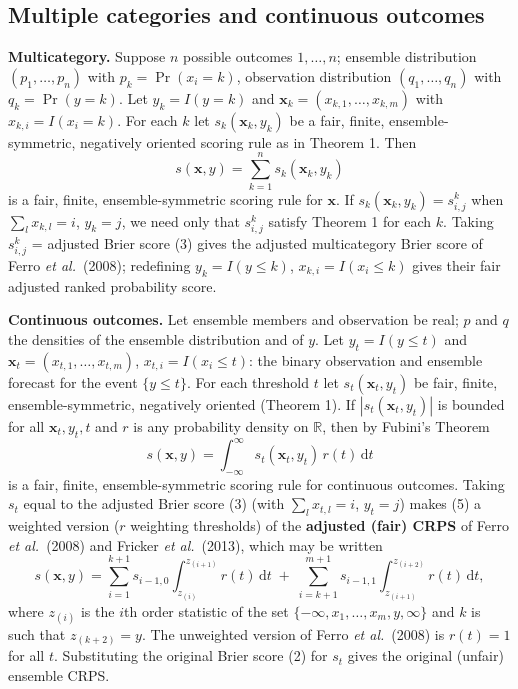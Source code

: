 \documentclass{article}
\newcommand{\bx}{\mathbf{x}}
\newcommand{\dd}{\mathrm{d}}
\begin{document}
\subsection{Multiple categories and continuous outcomes}
\textbf{Multicategory.} Suppose $n$ possible outcomes $1,\dots,n$; ensemble
distribution $(p_1,\dots,p_n)$ with $p_k=\Pr(x_i=k)$, observation distribution
$(q_1,\dots,q_n)$ with $q_k=\Pr(y=k)$. Let $y_k=I(y=k)$ and
$\bx_k=(x_{k,1},\dots,x_{k,m})$ with $x_{k,i}=I(x_i=k)$. For each $k$ let
$s_k(\bx_k,y_k)$ be a fair, finite, ensemble-symmetric, negatively oriented
scoring rule as in Theorem 1. Then
\begin{equation}\tag{4}
  s(\bx,y) = \sum_{k=1}^n s_k(\bx_k,y_k)
\end{equation}
is a fair, finite, ensemble-symmetric scoring rule for $\bx$. If
$s_k(\bx_k,y_k)=s^k_{i,j}$ when $\sum_l x_{k,l}=i$, $y_k=j$, we need only that
$s^k_{i,j}$ satisfy Theorem 1 for each $k$. Taking $s^k_{i,j}$ = adjusted Brier
score (3) gives the adjusted multicategory Brier score of Ferro \emph{et al.}\
(2008); redefining $y_k=I(y\le k)$, $x_{k,i}=I(x_i\le k)$ gives their fair
adjusted ranked probability score.

\textbf{Continuous outcomes.} Let ensemble members and observation be real;
$p$ and $q$ the densities of the ensemble distribution and of $y$. Let
$y_t=I(y\le t)$ and $\bx_t=(x_{t,1},\dots,x_{t,m})$, $x_{t,i}=I(x_i\le t)$:
the binary observation and ensemble forecast for the event $\{y\le t\}$. For
each threshold $t$ let $s_t(\bx_t,y_t)$ be fair, finite, ensemble-symmetric,
negatively oriented (Theorem 1). If $|s_t(\bx_t,y_t)|$ is bounded for all
$\bx_t,y_t,t$ and $r$ is any probability density on $\mathbb{R}$, then by
Fubini's Theorem
\begin{equation}\tag{5}
  s(\bx,y) = \int_{-\infty}^{\infty} s_t(\bx_t,y_t)\,r(t)\,\dd t
\end{equation}
is a fair, finite, ensemble-symmetric scoring rule for continuous outcomes.
Taking $s_t$ equal to the adjusted Brier score (3) (with $\sum_l x_{t,l}=i$,
$y_t=j$) makes (5) a weighted version ($r$ weighting thresholds) of the
\textbf{adjusted (fair) CRPS} of Ferro \emph{et al.}\ (2008) and Fricker
\emph{et al.}\ (2013), which may be written
\[
  s(\bx,y) = \sum_{i=1}^{k+1} s_{i-1,0}\int_{z_{(i)}}^{z_{(i+1)}} r(t)\,\dd t
  \;+\; \sum_{i=k+1}^{m+1} s_{i-1,1}\int_{z_{(i+1)}}^{z_{(i+2)}} r(t)\,\dd t ,
\]
where $z_{(i)}$ is the $i$th order statistic of the set
$\{-\infty,x_1,\dots,x_m,y,\infty\}$ and $k$ is such that $z_{(k+2)}=y$. The
unweighted version of Ferro \emph{et al.}\ (2008) is $r(t)=1$ for all $t$.
Substituting the original Brier score (2) for $s_t$ gives the original
(unfair) ensemble CRPS.
\end{document}
